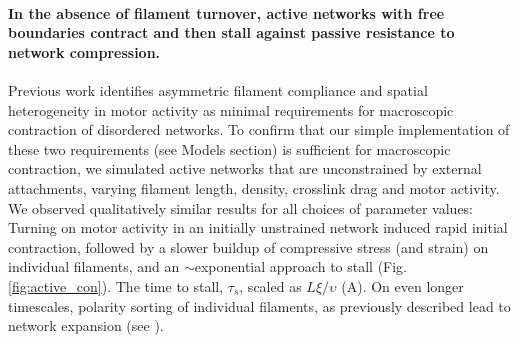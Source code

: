 \paragraph{In the absence of filament turnover, active networks with free boundaries contract and then stall against passive resistance to network compression.}


Previous work \cite{1367-2630-14-3-033037,rheo_2D1,rheo_active} identifies asymmetric filament compliance and spatial heterogeneity in motor activity as minimal requirements for macroscopic contraction of disordered networks. To confirm that our simple implementation of these two requirements (see Models section) is sufficient for macroscopic contraction, we simulated active networks that are unconstrained by external attachments, varying filament length, density, crosslink drag and motor activity.  We observed qualitatively similar results for all choices of parameter values:  Turning on motor activity in an initially unstrained network induced rapid initial contraction, followed by a slower buildup of compressive stress (and strain) on individual filaments, and an $\sim$exponential approach to stall (Fig. \ref{fig:active_con}). The time to stall, $\tau_s$, scaled as $L\xi/\upsilon$ (A). On even longer timescales, polarity sorting of individual filaments, as previously described \cite{Reymann1310,Murrell15062014,Ndlec:1997aa,Surrey1167} lead to network expansion (see ).


